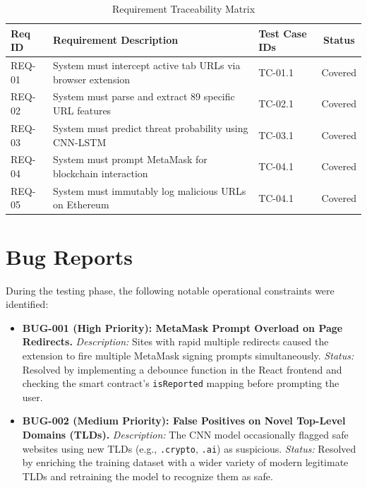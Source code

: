 \begin{table}[htbp]
    \centering
    \renewcommand{\arraystretch}{1.5}
    \begin{tabular}{|p{}|p{}|p{}|c|}
        \hline
        \textbf{Req ID} & \textbf{Requirement Description} & \textbf{Test Case IDs} & \textbf{Status} \\ 
        \hline
        REQ-01 & System must intercept active tab URLs via browser extension & TC-01.1 & Covered \\ 
        \hline
        REQ-02 & System must parse and extract 89 specific URL features & TC-02.1 & Covered \\ 
        \hline
        REQ-03 & System must predict threat probability using CNN-LSTM & TC-03.1 & Covered \\ 
        \hline
        REQ-04 & System must prompt MetaMask for blockchain interaction & TC-04.1 & Covered \\ 
        \hline
        REQ-05 & System must immutably log malicious URLs on Ethereum & TC-04.1 & Covered \\ 
        \hline
    \end{tabular}
    \vspace{0.2cm}
    \caption{Requirement Traceability Matrix}
\end{table}

\section{Bug Reports}
During the testing phase, the following notable operational constraints were identified:

\begin{itemize}
    \item \textbf{BUG-001 (High Priority): MetaMask Prompt Overload on Page Redirects.} 
    \newline \textit{Description:} Sites with rapid multiple redirects caused the extension to fire multiple MetaMask signing prompts simultaneously. 
    \newline \textit{Status:} Resolved by implementing a debounce function in the React frontend and checking the smart contract's \texttt{isReported} mapping before prompting the user.
    
    \item \textbf{BUG-002 (Medium Priority): False Positives on Novel Top-Level Domains (TLDs).} 
    \newline \textit{Description:} The CNN model occasionally flagged safe websites using new TLDs (e.g., \texttt{.crypto}, \texttt{.ai}) as suspicious. 
    \newline \textit{Status:} Resolved by enriching the training dataset with a wider variety of modern legitimate TLDs and retraining the model to recognize them as safe.
\end{itemize}

